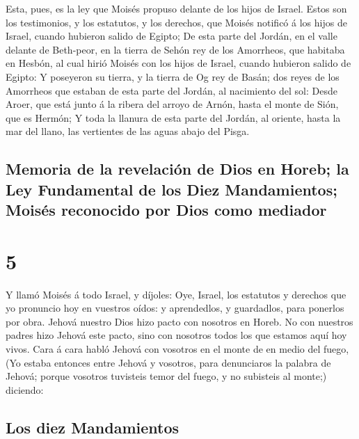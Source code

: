  Esta, pues, es la ley que Moisés propuso delante de los
hijos de Israel.  Estos son los testimonios, y los
estatutos, y los derechos, que Moisés notificó á los hijos de Israel,
cuando hubieron salido de Egipto;  De esta parte del
Jordán, en el valle delante de Beth-peor, en la tierra de Sehón rey de
los Amorrheos, que habitaba en Hesbón, al cual hirió Moisés con los
hijos de Israel, cuando hubieron salido de Egipto:  Y
poseyeron su tierra, y la tierra de Og rey de Basán; dos reyes de los
Amorrheos que estaban de esta parte del Jordán, al nacimiento del sol:
 Desde Aroer, que está junto á la ribera del arroyo de
Arnón, hasta el monte de Sión, que es Hermón;  Y toda la
llanura de esta parte del Jordán, al oriente, hasta la mar del llano,
las vertientes de las aguas abajo del Pisga.

\hypertarget{memoria-de-la-revelaciuxf3n-de-dios-en-horeb-la-ley-fundamental-de-los-diez-mandamientos-moisuxe9s-reconocido-por-dios-como-mediador}{%
\subsection{Memoria de la revelación de Dios en Horeb; la Ley
Fundamental de los Diez Mandamientos; Moisés reconocido por Dios como
mediador}\label{memoria-de-la-revelaciuxf3n-de-dios-en-horeb-la-ley-fundamental-de-los-diez-mandamientos-moisuxe9s-reconocido-por-dios-como-mediador}}

\hypertarget{section-4}{%
\section{5}\label{section-4}}

 Y llamó Moisés á todo Israel, y díjoles: Oye, Israel, los
estatutos y derechos que yo pronuncio hoy en vuestros oídos: y
aprendedlos, y guardadlos, para ponerlos por obra.  Jehová
nuestro Dios hizo pacto con nosotros en Horeb.  No con
nuestros padres hizo Jehová este pacto, sino con nosotros todos los que
estamos aquí hoy vivos.  Cara á cara habló Jehová con
vosotros en el monte de en medio del fuego,  (Yo estaba
entonces entre Jehová y vosotros, para denunciaros la palabra de Jehová;
porque vosotros tuvisteis temor del fuego, y no subisteis al monte;)
diciendo:

\hypertarget{los-diez-mandamientos}{%
\subsection{Los diez Mandamientos}\label{los-diez-mandamientos}}

